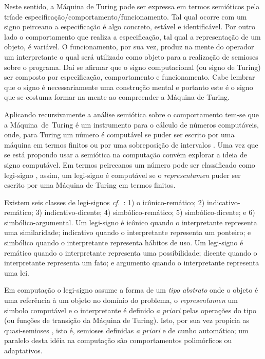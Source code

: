 Neste sentido, a Máquina de Turing pode ser expressa em termos semióticos pela tríade especificação/comportamento/funcionamento. Tal qual ocorre com um signo peirceano a especificação é algo concreto, estável e identificável. Por outro lado o comportamento que realiza a especificação, tal qual a representação de um objeto, é variável. O funcionamento, por sua vez, produz na mente do operador um interpretante o qual será utilizado como objeto para a realização de semioses sobre o programa. Daí se afirmar que o signo computacional (ou signo de Turing) ser composto por especificação, comportamento e funcionamento. Cabe lembrar que o signo é necessariamente uma construção mental e portanto este é o signo que se costuma formar na mente ao compreender a Máquina de Turing.

Aplicando recursivamente a análise semiótica sobre o comportamento tem-se que a Máquina~de~Turing é um instrumento para o cálculo de números computáveis, onde, para Turing um número é computável se puder ser escrito por uma máquina em termos finitos \cite{turing36} ou por uma sobreposição de intervalos \cite{turing36_errata}. Uma vez que se está propondo usar a semiótica na computação convém explorar a ideia de signo computável. Em termos peirceanos um número pode ser classificado como legi-signo \cite{winfried}, assim, um legi-signo é computável se o \textit{representamen} puder ser escrito por uma Máquina de Turing em termos finitos.

Existem seis classes de legi-signos \textit{cf.}~\cite{teoriaSignos_Santaella}: 1)  o icônico-remático; 2) indicativo-remático; 3) indicativo-dicente; 4) simbólico-remático; 5) simbólico-dicente; e 6) simbólico-argumental. Um legi-signo é icônico quando o interpretante representa uma similaridade; indicativo quando o interpretante representa um ponteiro; e simbólico quando o interpretante representa hábitos de uso. Um legi-signo é remático quando o interpretante representa uma possibilidade; dicente quando o interpretante representa um fato; e argumento quando o interpretante representa uma lei.

Em computação o legi-signo assume a forma de um \emph{tipo abstrato} onde o objeto é uma referência à um objeto no domínio do problema, o \textit{representamen} um simbolo computável e o interpretante é definido \textit{a priori} pelas operações do tipo (ou funções de transição da Máquina de Turing). Isto, por sua vez propicia as quasi-semioses \cite{winfried}, isto é, semioses definidas \textit{a priori} e de cunho automático; um paralelo desta idéia na computação são comportamentos polimórficos ou adaptativos.

